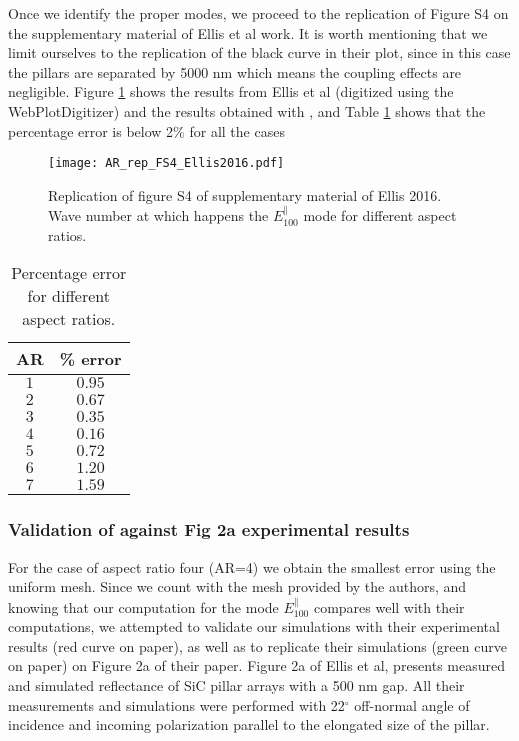 Once we identify the proper modes, we proceed to the replication of Figure S4 on the 
supplementary material of Ellis et al work. It is worth mentioning that we limit ourselves to
the replication of the black curve in their plot, since in this case the pillars are separated 
by 5000 nm which means the coupling effects are negligible. Figure \ref{fig:rep_FS4_ellis} shows
the results from  Ellis et al (digitized using the WebPlotDigitizer) and the results obtained
with \pygbe, and Table \ref{tab:err_AR} shows that the percentage error is below 2$\%$ for all
the cases


\begin{figure}
    \centering
    \texttt{[image: AR\_rep\_FS4\_Ellis2016.pdf]} 
    \caption{Replication of figure S4 of supplementary material of Ellis 2016. Wave
    number at which happens the $E^{\parallel}_{100}$ mode for different aspect ratios.}
    \label{fig:rep_FS4_ellis}
 \end{figure}
 
 \begin{table}
    \centering
    \caption{Percentage error for different aspect ratios.} 
    \label{tab:err_AR}
    \begin{tabular}{c c}
    \hline%
    AR & \% error \\
    \hline%
     $1$ & $0.95$ \\
     $2$ & $0.67$ \\
     $3$ & $0.35$ \\
     $4$ & $0.16$ \\
     $5$ & $0.72$ \\
     $6$ & $1.20$ \\
     $7$ & $1.59$ \\
    \hline%
    \end{tabular}
\end{table}

\subsubsection{Validation of \pygbe against Fig 2a experimental results}

For the case of aspect ratio four (AR=4) we obtain the smallest error using the uniform
mesh. Since we count with the mesh provided by the authors, and knowing that our computation 
for the mode $E^{\parallel}_{100}$ compares well with their computations, we attempted to 
validate our simulations with their experimental results (red curve on paper), as well 
as to replicate their simulations (green curve on paper) on Figure 2a of their paper.
Figure 2a of Ellis et al, presents measured and simulated reflectance of SiC pillar
arrays with a 500 nm gap. All their measurements and simulations were performed with 
22$^\circ$ off-normal angle of incidence and incoming polarization parallel to the 
elongated size of the pillar. 


